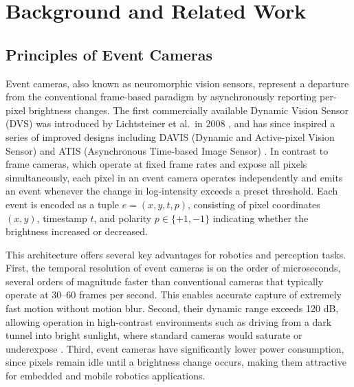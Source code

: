 \chapter{Background and Related Work}\label{chap:background}

\section{Principles of Event Cameras}

Event cameras, also known as neuromorphic vision sensors, represent a departure from the conventional frame-based paradigm by asynchronously reporting per-pixel brightness changes. The first commercially available Dynamic Vision Sensor (DVS) was introduced by Lichtsteiner et al.\ in 2008 \cite{Lichtsteiner2008DVS}, and has since inspired a series of improved designs including DAVIS (Dynamic and Active-pixel Vision Sensor) \cite{Brandli2014DAVIS} and ATIS (Asynchronous Time-based Image Sensor) \cite{Posch2014Retinomorphic}. In contrast to frame cameras, which operate at fixed frame rates and expose all pixels simultaneously, each pixel in an event camera operates independently and emits an event whenever the change in log-intensity exceeds a preset threshold. Each event is encoded as a tuple $e=(x,y,t,p)$, consisting of pixel coordinates $(x,y)$, timestamp $t$, and polarity $p \in \{+1,-1\}$ indicating whether the brightness increased or decreased.

This architecture offers several key advantages for robotics and perception tasks. First, the temporal resolution of event cameras is on the order of microseconds, several orders of magnitude faster than conventional cameras that typically operate at 30–60 frames per second. This enables accurate capture of extremely fast motion without motion blur. Second, their dynamic range exceeds 120 dB, allowing operation in high-contrast environments such as driving from a dark tunnel into bright sunlight, where standard cameras would saturate or underexpose \cite{Gallego2020Survey}. Third, event cameras have significantly lower power consumption, since pixels remain idle until a brightness change occurs, making them attractive for embedded and mobile robotics applications.

